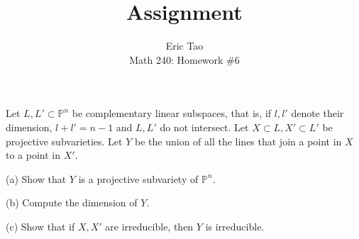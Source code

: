 \documentclass[10pt]{article}
\newenvironment{problem}[2][Problem]{\begin{trivlist}
\item[\hskip \labelsep {\bfseries #1}\hskip \labelsep {\bfseries #2.}]}{\end{trivlist}}
\begin{document}
 
\title{Assignment}
\author{Eric Tao\\
Math 240: Homework \#6}
\maketitle
 
\begin{problem}{6.1}

Let $L,L' \subset \mathbb{P}^n$ be complementary linear subspaces, that is, if $l,l'$ denote their dimension, $l + l' = n -1$ and $L,L'$ do not intersect. Let $X \subset L, X' \subset L'$ be projective subvarieties. Let $Y$ be the union of all the lines that join a point in $X$ to a point in $X'$.

(a) Show that $Y$ is a projective subvariety of $\mathbb{P}^n$.

(b) Compute the dimension of $Y$.

(c) Show that if $X,X'$ are irreducible, then $Y$ is irreducible.

\end{problem}
\end{document}
